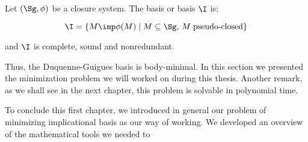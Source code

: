 \begin{definition} Let $(\Sg, \phi)$ be a 
closure system. The  basis or  
basis $\I$ is:

	\[ \I = \{ M \imp \phi(M) \; | \; M \subseteq \Sg, \, M \;
		\text{pseudo-closed} \} \]

\noindent and $\I$ is complete, sound and nonredundant.
\end{definition}

\noindent Thus, the Duquenne-Guigues basis is body-minimal. In this section 
we presented the minimization problem we will worked on during this thesis. 
Another remark, as we shall see in the next chapter, this problem is solvable
in polynomial time.

\space{1.2em}

To conclude this first chapter, we introduced in general our problem of 
minimizing implicational basis as our way of working. We developed an overview 
of the mathematical tools we needed to 
